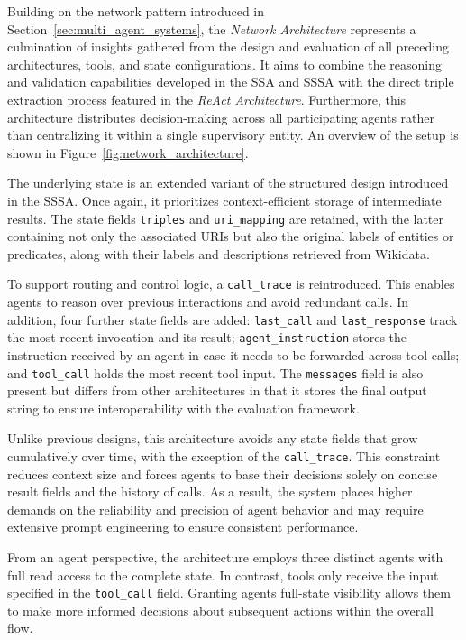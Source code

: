 \documentclass[a4paper,oneside,bibliography=totoc]{scrbook}
\begin{document}
Building on the network pattern introduced in Section~\ref{sec:multi_agent_systems}, the \textit{Network Architecture} represents a culmination of insights gathered from the design and evaluation of all preceding architectures, tools, and state configurations. It aims to combine the reasoning and validation capabilities developed in the \ac{SSA} and \ac{SSSA} with the direct triple extraction process featured in the \textit{ReAct Architecture}. Furthermore, this architecture distributes decision-making across all participating agents rather than centralizing it within a single supervisory entity. An overview of the setup is shown in Figure~\ref{fig:network_architecture}.

The underlying state is an extended variant of the structured design introduced in the \ac{SSSA}. Once again, it prioritizes context-efficient storage of intermediate results. The state fields \texttt{triples} and \texttt{uri\_mapping} are retained, with the latter containing not only the associated URIs but also the original labels of entities or predicates, along with their labels and descriptions retrieved from Wikidata.

To support routing and control logic, a \texttt{call\_trace} is reintroduced. This enables agents to reason over previous interactions and avoid redundant calls. In addition, four further state fields are added: \texttt{last\_call} and \texttt{last\_response} track the most recent invocation and its result; \texttt{agent\_instruction} stores the instruction received by an agent in case it needs to be forwarded across tool calls; and \texttt{tool\_call} holds the most recent tool input. The \texttt{messages} field is also present but differs from other architectures in that it stores the final output string to ensure interoperability with the evaluation framework.

Unlike previous designs, this architecture avoids any state fields that grow cumulatively over time, with the exception of the \texttt{call\_trace}. This constraint reduces context size and forces agents to base their decisions solely on concise result fields and the history of calls. As a result, the system places higher demands on the reliability and precision of agent behavior and may require extensive prompt engineering to ensure consistent performance.

From an agent perspective, the architecture employs three distinct agents with full read access to the complete state. In contrast, tools only receive the input specified in the \texttt{tool\_call} field. Granting agents full-state visibility allows them to make more informed decisions about subsequent actions within the overall flow.
\end{document}

